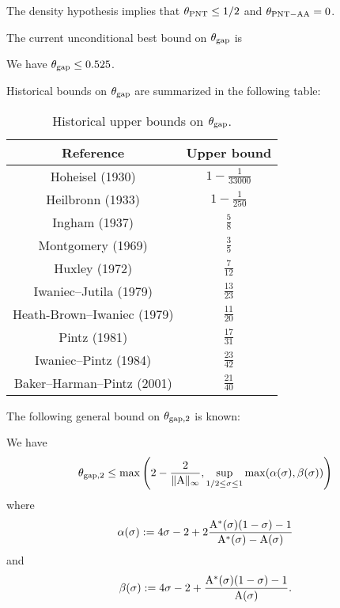 \begin{corollary}  The density hypothesis implies that $\theta_{\mathrm{PNT}} \leq 1/2$ and $\theta_{\mathrm{PNT-AA}} = 0$.
\end{corollary}

The current unconditional best bound on $\theta_{\mathrm{gap}}$ is

\begin{theorem}\label{bhp-thm}\cite{baker-harman-pintz} We have $\theta_{\mathrm{gap}} \leq 0.525$.
\end{theorem}

Historical bounds on $\theta_{\mathrm{gap}}$ are summarized in the following table:

\begin{table}[ht]
    \caption{Historical upper bounds on $\theta_{\mathrm{gap}}$.}
    \centering
    \renewcommand{\arraystretch}{1.2}
    \begin{tabular}{|c|c|}
    \hline
    Reference & Upper bound \\
    \hline
    Hoheisel (1930) \cite{hoheisel_1930} & $1 - \frac{1}{33000}$ \\
    Heilbronn (1933) \cite{heilbronn_1933} & $1 - \frac{1}{250}$ \\
    Ingham (1937) \cite{ingham_difference_1937} & $\frac{5}{8}$ \\
    Montgomery (1969) \cite{montgomery_1969} & $\frac{3}{5}$ \\
    Huxley (1972) \cite{Huxley} & $\frac{7}{12}$ \\
    Iwaniec--Jutila (1979)\cite{iwaniec-jutila} & $\frac{13}{23}$ \\
    Heath-Brown--Iwaniec (1979) \cite{heathbrown_iwaniec_1979} & $\frac{11}{20}$ \\
    Pintz (1981) \cite{pintz_1981} & $\frac{17}{31}$ \\
    Iwaniec--Pintz (1984) \cite{iwaniec-pintz} & $\frac{23}{42}$\\
    Baker--Harman--Pintz (2001) \cite{baker-harman-pintz} & $\frac{21}{40}$ \\
    \hline
    \end{tabular}
    \end{table}\label{gapmax-table}


The following general bound on $\theta_{\mathrm{gap},2}$ is known:

\begin{proposition}\label{gapsquare-from-a}
    We have
    $$ \theta_{\mathrm{gap},2} \leq \max\left( 2-\frac{2}{\|\mathrm{A}\|_\infty}, \sup_{1/2 \leq \sigma \leq 1} \max(\alpha(\sigma), \beta(\sigma))\right)$$
    where
    $$ \alpha(\sigma) := 4\sigma-2 + 2 \frac{\mathrm{A}^*(\sigma)(1-\sigma)-1}{\mathrm{A}^*(\sigma)-\mathrm{A}(\sigma)}$$
    and
    $$ \beta(\sigma) := 4\sigma-2 + \frac{\mathrm{A}^*(\sigma)(1-\sigma)-1}{\mathrm{A}(\sigma)}.$$
\end{proposition}

